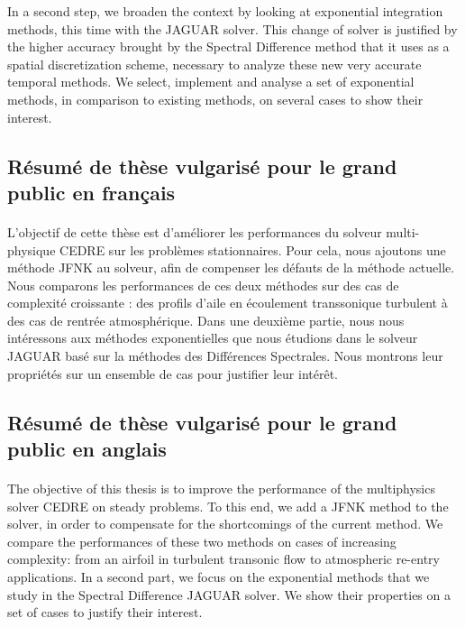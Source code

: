 In a second step, we broaden the context by looking at exponential integration methods, this time with the JAGUAR solver.
This change of solver is justified by the higher accuracy brought by the Spectral Difference method that it uses as a spatial discretization scheme, necessary to analyze these new very accurate temporal methods.
We select, implement and analyse a set of exponential methods, in comparison to existing methods, on several cases to show their interest.


  \subsection{Résumé de thèse vulgarisé pour le grand public en français}

    \paragraph{}
L'objectif de cette thèse est d'améliorer les performances du solveur multi-physique CEDRE sur les problèmes stationnaires.
Pour cela, nous ajoutons une méthode JFNK au solveur, afin de compenser les défauts de la méthode actuelle.
Nous comparons les performances de ces deux méthodes sur des cas de complexité croissante : des profils d'aile en écoulement transsonique turbulent à des cas de rentrée atmosphérique.
Dans une deuxième partie, nous nous intéressons aux méthodes exponentielles que nous étudions dans le solveur JAGUAR basé sur la méthodes des Différences Spectrales.
Nous montrons leur propriétés sur un ensemble de cas pour justifier leur intérêt.


  \subsection{Résumé de thèse vulgarisé pour le grand public en anglais}

  \paragraph{}
The objective of this thesis is to improve the performance of the multiphysics solver CEDRE on steady problems.
To this end, we add a JFNK method to the solver, in order to compensate for the shortcomings of the current method.
We compare the performances of these two methods on cases of increasing complexity: from an airfoil in turbulent transonic flow to atmospheric re-entry applications.
In a second part, we focus on the exponential methods that we study in the Spectral Difference JAGUAR solver.
We show their properties on a set of cases to justify their interest.
